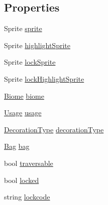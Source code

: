 \subsection*{Properties}
\begin{DoxyCompactItemize}
\item 
Sprite \mbox{\hyperlink{class_base_decoration_a784d075121ac6fb2360c45ae7f7ec6ad}{sprite}}
\item 
Sprite \mbox{\hyperlink{class_base_decoration_ab86a6f2f66ec7c7c4b2aa0813080133c}{highlight\+Sprite}}
\item 
Sprite \mbox{\hyperlink{class_base_decoration_a4d92d8545d17f46daa590aa37e04531f}{lock\+Sprite}}
\item 
Sprite \mbox{\hyperlink{class_base_decoration_a119c7bf4539a0ace2f1692c85896adf6}{lock\+Highlight\+Sprite}}
\item 
\mbox{\hyperlink{class_biome}{Biome}} \mbox{\hyperlink{class_base_decoration_a7d83022e124cdef6c7484c0689c94352}{biome}}
\item 
\mbox{\hyperlink{class_base_decoration_ad8b9ff9e5d7dc488ca94fed2efa45a6e}{Usage}} \mbox{\hyperlink{class_base_decoration_a502a5352e9f53da746d96a75ff31c3f0}{usage}}
\item 
\mbox{\hyperlink{class_base_decoration_a8adb8095439bd24fd3c2058b2ecbbf11}{Decoration\+Type}} \mbox{\hyperlink{class_base_decoration_aa867b32ac804fb07be5ea225d0ee1b28}{decoration\+Type}}
\item 
\mbox{\hyperlink{class_bag}{Bag}} \mbox{\hyperlink{class_base_decoration_ac89ba4289b6d0b80d564aeb969615a3f}{bag}}
\item 
bool \mbox{\hyperlink{class_base_decoration_ab85285ed546a07d59b797491f03f857f}{traversable}}
\item 
bool \mbox{\hyperlink{class_base_decoration_af2de5b4108e95dde06664e23e7a4560e}{locked}}
\item 
string \mbox{\hyperlink{class_base_decoration_acf15e96984c879deb920b0a3acffcd07}{lockcode}}
\end{DoxyCompactItemize}


